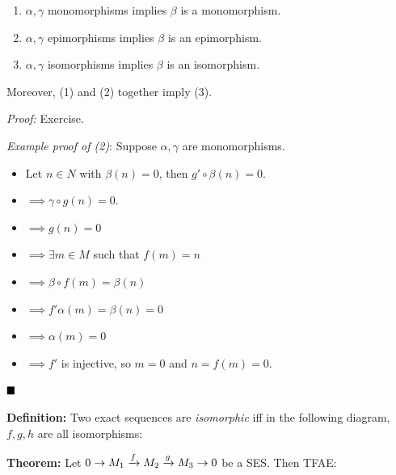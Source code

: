 \begin{enumerate}
\def\labelenumi{\arabic{enumi}.}
\item
  \(\alpha, \gamma\) monomorphisms implies \(\beta\) is a monomorphism.
\item
  \(\alpha, \gamma\) epimorphisms implies \(\beta\) is an epimorphism.
\item
  \(\alpha, \gamma\) isomorphisms implies \(\beta\) is an isomorphism.
\end{enumerate}

Moreover, (1) and (2) together imply (3).

\emph{Proof:} Exercise.

\emph{Example proof of (2)}: Suppose \(\alpha, \gamma\) are
monomorphisms.

\begin{itemize}
\tightlist
\item
  Let \(n\in N\) with \(\beta(n) = 0\), then \(g' \circ \beta(n) = 0\).
\item
  \(\implies \gamma \circ g (n) = 0\).
\item
  \(\implies g(n) = 0\)
\item
  \(\implies \exists m\in M\) such that \(f(m) = n\)
\item
  \(\implies \beta \circ f (m) = \beta(n)\)
\item
  \(\implies f' \alpha(m) = \beta (n) = 0\)
\item
  \(\implies \alpha(m) = 0\)
\item
  \(\implies f'\) is injective, so \(m=0\) and \(n=f(m) = 0\).
\end{itemize}

\(\qed\)

\textbf{Definition:} Two exact sequences are \emph{isomorphic} iff in
the following diagram, \(f,g,h\) are all isomorphisms:

\begin{center}
\end{center}

\textbf{Theorem:} Let \(0 \to M_1 \xrightarrow{f} M_2 \xrightarrow{g} M_3 \to 0\)
be a SES. Then TFAE:

